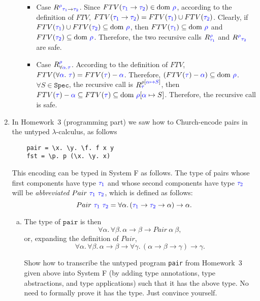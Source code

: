 \documentclass{article}
\theoremstyle{definition}
\newcommand{\meta}[1]{{\color{blue}#1}}
\newcommand{\dom}[1]{\ensuremath{\text{dom}\ #1}}
\begin{document}
\begin{enumerate}[start=1,label={{\bf Problem \arabic*}.},ref=\arabic*,left=0pt..0pt,widest*=10,align=left,itemindent=*]
\begin{enumerate}[(a),left=1em]
    \begin{itemize}
      \item Case $R^\meta{\rho}_{\meta{\tau_1}\to\meta{\tau_2}}$. Since $FTV(\meta{\tau_1}\to\meta{\tau_2}) \in \dom \meta{\rho}$, according to the definition of $FTV$, $FTV(\meta{\tau_1}\to\meta{\tau_2}) = FTV(\meta{\tau_1})\cup FTV(\meta{\tau_2})$. Clearly, if $FTV(\meta{\tau_1})\cup FTV(\meta{\tau_2})\subseteq \dom\meta{\rho}$, then $FTV(\meta{\tau_1}) \subseteq \dom\meta{\rho}$ and $FTV(\meta{\tau_2})\subseteq \dom\meta{\rho}$. Therefore, the two recursive calls $R^{\meta{\rho}}_\meta{\tau_1}$ and $R^\meta{\rho}_\meta{\tau_2}$ are safe.
      \item Case $R^{\meta{\rho}}_{\forall \meta{\alpha}. \meta{\tau}}$. According to the definition of $FTV$, $FTV(\forall\meta{\alpha}.\ \meta{\tau}) = FTV(\meta{\tau}) - \set{\meta{\alpha}}$. Therefore, $(FTV(\meta{\tau}) - \set{\meta{\alpha}}) \subseteq \dom\meta{\rho}$. $\forall S\in \texttt{Spec}$, the recursive call is $R_{\meta{\tau}}^{\rho [\meta{\alpha\mapsto S}]}$, then $FTV(\meta{\tau}) - \set{\meta{\alpha}} \subseteq FTV(\meta{\tau}) \subseteq \dom\meta{\rho}[\meta{\alpha}\mapsto S]$. Therefore, the recursive call is safe. 
    \end{itemize}
  \end{enumerate}
\item In Homework~3 (programming part) we saw how to Church-encode pairs in the
  untyped $\lambda$-calculus, as follows
\begin{verbatim}
    pair = \x. \y. \f. f x y
    fst = \p. p (\x. \y. x)
\end{verbatim}
  This encoding can be typed in System F as follows. The type of pairs whose
  first components have type $\meta{\tau_1}$ and whose second components have
  type $\meta{\tau_2}$ will be \emph{abbreviated}
  $Pair\ \meta{\tau_1}\ \meta{\tau_2}$, which is defined as follows:
  \[
    Pair\ \meta{\tau_1}\ \meta{\tau_2} = \forall\alpha.\, (\meta{\tau_1}\to\meta{\tau_2}\to\alpha)\to\alpha.
  \]
  \begin{enumerate}[(a),left=1em]
  \item
    The type of $\mathtt{pair}$ is then
    \[
      \forall\alpha.\,\forall\beta.\, \alpha\to\beta\to Pair\ \alpha\ \beta,
    \]
    or, expanding the definition of $Pair$,
    \[
      \forall\alpha.\,\forall\beta.\, \alpha\to\beta\to \forall\gamma.\, (\alpha\to\beta\to\gamma)\to\gamma.
    \]

    Show how to transcribe the untyped program \texttt{pair} from Homework~3
    given above into System F (by adding type annotations, type abstractions,
    and type applications) such that it has the above type. No need to formally
    prove it has the type. Just convince yourself.


\end{enumerate}
\end{enumerate}
\end{document}
